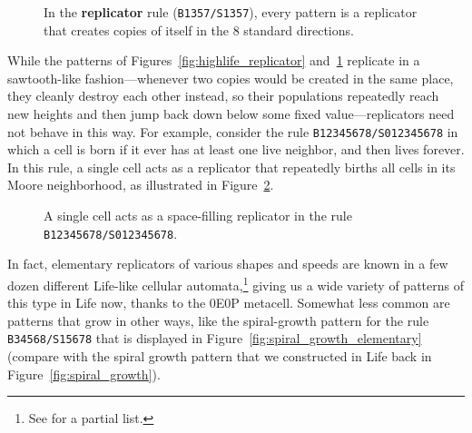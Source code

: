 \begin{figure}[!htb]
	\centering
	\caption{In the \textbf{replicator} rule (\texttt{B1357/S1357}), every pattern is a replicator that creates copies of itself in the $8$ standard directions.}\label{fig:replicator_smile}
\end{figure}

While the patterns of Figures~\ref{fig:highlife_replicator} and~\ref{fig:replicator_smile} replicate in a sawtooth-like fashion---whenever two copies would be created in the same place, they cleanly destroy each other instead, so their populations repeatedly reach new heights and then jump back down below some fixed value---replicators need not behave in this way. For example, consider the rule \texttt{B12345678/S012345678} in which a  cell is born if it ever has at least one live neighbor, and then lives forever. In this rule, a single cell acts as a replicator that repeatedly births all cells in its Moore neighborhood, as illustrated in Figure~\ref{fig:all_births_replicator}.

\begin{figure}[!htb]
	\centering
	\caption{A single cell acts as a space-filling replicator in the rule \texttt{B12345678/S012345678}.}\label{fig:all_births_replicator}
\end{figure}

In fact, elementary replicators of various shapes and speeds are known in a few dozen different Life-like cellular automata,\footnote{See  for a partial list.} giving us a wide variety of patterns of this type in Life now, thanks to the 0E0P metacell. Somewhat less common are patterns that grow in other ways, like the spiral-growth pattern for the rule \texttt{B34568/S15678} that is displayed in Figure~\ref{fig:spiral_growth_elementary} (compare with the spiral growth pattern that we constructed in Life back in Figure~\ref{fig:spiral_growth}).

